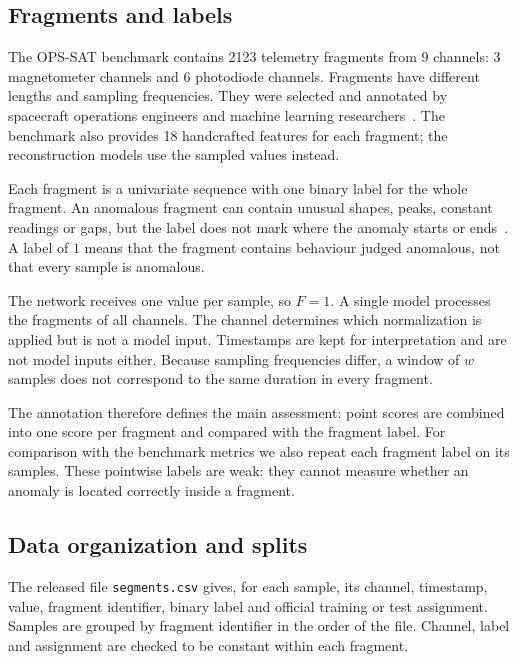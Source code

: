 \subsection{Fragments and labels}
\label{sec:datasets-opssat-labels}

The \ac{OPS-SAT} benchmark contains \num{2123} telemetry fragments from
\num{9} channels: \num{3} magnetometer channels and \num{6} photodiode
channels. Fragments have different lengths and sampling frequencies. They
were selected and annotated by spacecraft operations engineers and machine
learning researchers~\cite{Ruszczak2025OPSSAT}. The benchmark also provides
\num{18} handcrafted features for each fragment; the reconstruction models
use the sampled values instead.

Each fragment is a univariate sequence with one binary label for the whole
fragment. An anomalous fragment can contain unusual shapes, peaks, constant
readings or gaps, but the label does not mark where the anomaly starts or
ends~\cite{Ruszczak2025OPSSAT}. A label of \(1\) means that the fragment
contains behaviour judged anomalous, not that every sample is anomalous.

The network receives one value per sample, so \(F=1\). A single model
processes the fragments of all channels. The channel determines which
normalization is applied but is not a model input. Timestamps are kept for
interpretation and are not model inputs either. Because sampling
frequencies differ, a window of \(w\) samples does not correspond to the
same duration in every fragment.

The annotation therefore defines the main assessment: point scores are
combined into one score per fragment and compared with the fragment label.
For comparison with the benchmark metrics we also repeat each fragment
label on its samples. These pointwise labels are weak: they cannot measure
whether an anomaly is located correctly inside a fragment.

\subsection{Data organization and splits}
\label{sec:datasets-opssat-splits}

The released file \texttt{segments.csv} gives, for each sample, its channel,
timestamp, value, fragment identifier, binary label and official training
or test assignment. Samples are grouped by fragment identifier in the order
of the file. Channel, label and assignment are checked to be constant
within each fragment.

